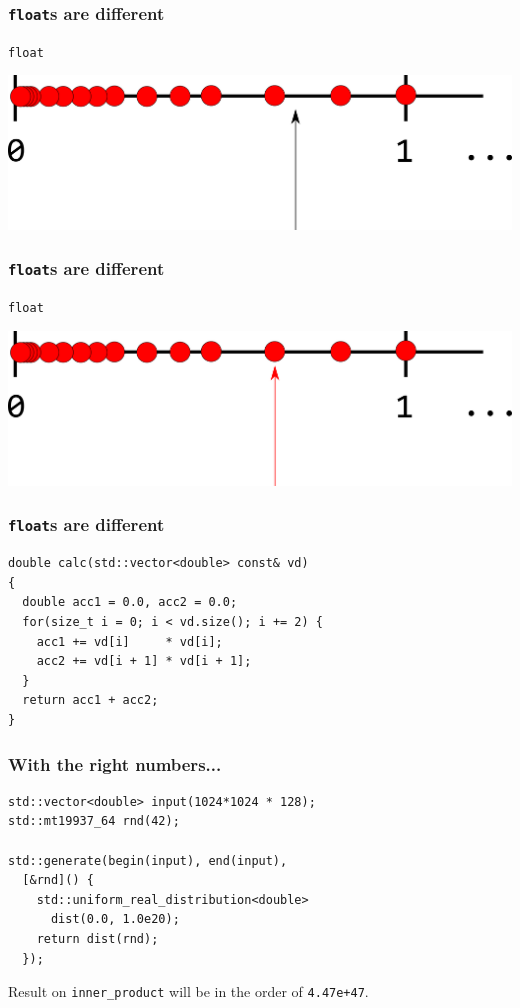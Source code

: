 \documentclass[aspectratio=43]{beamer}
\begin{document}
\begin{frame}
  \frametitle{\texttt{float}s are different}
  \texttt{float}

  \begin{center}
  \includegraphics[height=.3547\textheight]{resources/real_numbers_sample_1.png}
  \end{center}
\end{frame}

\begin{frame}
  \frametitle{\texttt{float}s are different}
  \texttt{float}

  \begin{center}
  \includegraphics[height=.3547\textheight]{resources/real_numbers_sample_2.png}
  \end{center}
\end{frame}

\begin{frame}[fragile]
  \frametitle{\texttt{float}s are different}
    \begin{lstlisting}
double calc(std::vector<double> const& vd)
{
  double acc1 = 0.0, acc2 = 0.0;
  for(size_t i = 0; i < vd.size(); i += 2) {
    acc1 += vd[i]     * vd[i];
    acc2 += vd[i + 1] * vd[i + 1];
  }
  return acc1 + acc2;
}
    \end{lstlisting}
\end{frame}

\begin{frame}[fragile]
  \frametitle{With the right numbers...}
    \begin{lstlisting}
std::vector<double> input(1024*1024 * 128);
std::mt19937_64 rnd(42);

std::generate(begin(input), end(input),
  [&rnd]() {
    std::uniform_real_distribution<double>
      dist(0.0, 1.0e20);
    return dist(rnd);
  });
\end{lstlisting}

Result on \texttt{inner\_product} will be in the order of \texttt{4.47e+47}.
\end{frame}
\end{document}
